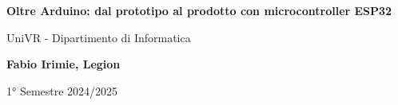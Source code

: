 \begin{titlepage}
	\begin{center}
		\vspace*{1cm}

		\Huge
    \textbf{Oltre Arduino: dal prototipo al prodotto con microcontroller ESP32}

		\vspace{0.5cm}
		\LARGE
		UniVR - Dipartimento di Informatica

		\vspace{1.5cm}

		\textbf{Fabio Irimie, Legion}

		\vfill


		\vspace{0.8cm}


		1° Semestre 2024/2025

	\end{center}
\end{titlepage}
